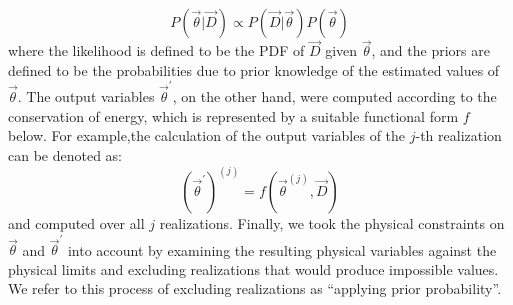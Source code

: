 \begin{equation}
    P(\vec{\theta}|\vec{D}) \propto P(\vec{D}|\vec{\theta})P(\vec{\theta})
\end{equation}
where the likelihood is defined to be the PDF of $\vec{D}$ given $\vec{\theta}$,
and the priors are
defined to be the probabilities due to prior knowledge of the estimated values of
$\vec{\theta}$. The output variables $\vec{\theta}^\prime$, on the other
hand, were computed according to the conservation of energy, which is
represented by a suitable functional form $f$ below. For example,the
calculation of the output variables of the $j$-th realization can be denoted as: 
\begin{equation}
    (\vec{\theta}^\prime)^{(j)} = f(\vec{\theta}^{(j)}, \vec{D}) 
\end{equation}    
and computed over all $j$ realizations. Finally, we took the physical
constraints on $\vec{\theta}$ and $\vec{\theta}^\prime$ into account by
examining the resulting physical variables against the physical limits and
excluding realizations that would produce impossible values. We refer to this
process of excluding realizations as ``applying prior probability''. 

